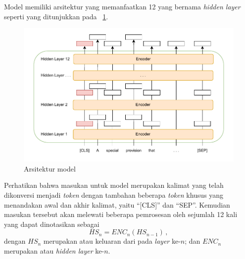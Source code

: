 Model \bert{} memiliki arsitektur yang memanfaatkan 12 \encoder{} yang bernama \textit{hidden layer} seperti yang ditunjukkan pada \gambar{}~\ref{fig:ilustrasi bert}.
\begin{figure}[!ht]
    \centering
    \includegraphics[scale=0.75]{assets/pdfs/IlustrasiBERT.drawio.pdf}
    \caption{Arsitektur model \bert{}}
    \label{fig:ilustrasi bert}
\end{figure}
Perhatikan bahwa masukan untuk model \bert{} merupakan kalimat yang telah dikonversi menjadi \textit{token} dengan tambahan beberapa \textit{token} khusus yang menandakan awal dan akhir kalimat, yaitu ``[CLS]'' dan ``SEP''. Kemudian masukan tersebut akan melewati beberapa pemrosesan oleh \encoder{} sejumlah 12 kali yang dapat dinotasikan sebagai
\[
HS_{n}=ENC_{n}(HS_{n-1}) \, ,
\]
dengan $HS_{n}$ merupakan \hs{} atau keluaran dari \encoder{} pada \textit{layer} ke-$n$; dan $ENC_{n}$ merupakan \encoder{} atau \textit{hidden layer} ke-$n$.

